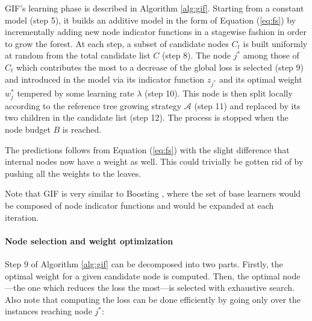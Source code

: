 \documentclass{article}
\begin{document}
GIF's learning phase is described in Algorithm \ref{alg:gif}.
Starting from a constant model (step 5), it builds an additive model in the 
form of Equation (\ref{eq:fs}) by incrementally adding new node indicator 
functions in a stagewise fashion in order to grow the forest.
At each step, a subset of candidate nodes $C_t$ is built uniformly at random 
from the total candidate list $C$ (step 8). The node $j^*$ among those of $C_t$ 
which contributes the most to a decrease of the global loss is selected (step 
9) and introduced in the model via its indicator function $z_{j^*}$ and its 
optimal weight $w^*_j$ tempered by some learning rate $\lambda$ (step 10). This 
node is then split locally according to the reference tree growing strategy 
$\mathcal{A}$ (step 11) and replaced by its two children in the candidate list 
(step 12). The process is stopped when the node budget $B$ is reached. 

The predictions follows from Equation (\ref{eq:fs}) with the slight difference 
that internal nodes now have a weight as well. This could trivially be gotten 
rid of by pushing all the weights to the leaves.


Note that GIF is very similar to Boosting \cite{hastie2009}, where the set of 
base learners would be composed of node indicator functions and would be 
expanded at each iteration.

\paragraph{Node selection and weight optimization}
Step 9 of Algorithm \ref{alg:gif} can be decomposed into two parts. Firstly, 
the optimal weight for a given candidate node is computed. Then, the optimal 
node---the one which reduces the loss the most---is selected with 
exhaustive search. Also note that computing the loss can be done efficiently 
by going only over the instances reaching node $j^*$:
\end{document}
